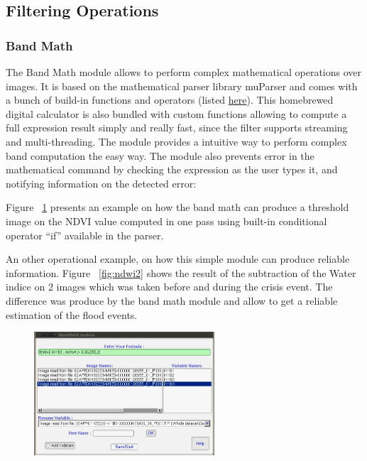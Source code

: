 \subsection{Filtering Operations}
\subsubsection{Band Math}
\label{Band_math module}
The Band Math module allows to perform complex mathematical operations
over images. It is based on the mathematical parser library muParser
and comes with a bunch of build-in functions and operators (listed
\href{http://muparser.sourceforge.net/mup_features.html#idDef2}{here}). This
homebrewed digital calculator is also bundled with custom functions
allowing to compute a full expression result simply and really fast,
since the filter supports streaming and multi-threading.  The \mont
module provides a intuitive way to perform complex band computation
the easy way. The module also prevents error in the mathematical
command by checking the expression as the user types it, and notifying
information on the detected error:

Figure ~\ref{fig:bandmathndvi} presents an example on how the band math
can produce a threshold image on the NDVI value computed in one pass
using built-in conditional operator ``if'' available in the parser.

An other operational example, on how this simple module can produce
reliable information.  Figure ~\ref{fig:ndwi2} shows the result of the
subtraction of the Water indice on 2 images which was taken before and
during the crisis event.  The difference was produce by the band math
module and allow to get a reliable estimation of the flood events.

\begin{figure}
  \center
  \includegraphics[width=0.6\textwidth]{../Art/MonteverdiImages/monteverdi_band_math_ndvi_threshold.png}
  \label{fig:bandmathndvi}
\end{figure}

